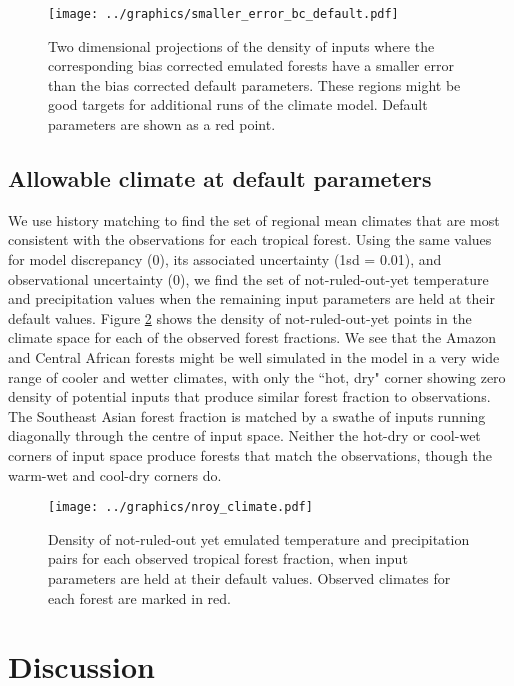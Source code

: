 \documentclass[gmd, manuscript]{copernicus}
\begin{document}
\begin{figure}[t]
\texttt{[image: ../graphics/smaller\_error\_bc\_default.pdf]}
\caption{Two dimensional projections of the density of inputs where the corresponding bias corrected emulated forests have a smaller error than the bias corrected default parameters. These regions might be good targets for additional runs of the climate model. Default parameters are shown as a red point.
}
\label{fig:smaller_error_bc_default}
\end{figure}


\subsection{Allowable climate at default parameters}
We use history matching to find the set of regional mean climates that are most consistent with the observations for each tropical forest. Using the same values for model discrepancy (0), its associated uncertainty (1sd = 0.01), and observational uncertainty (0), we find the set of not-ruled-out-yet temperature and precipitation values when the remaining input parameters are held at their default values. Figure \ref{fig:nroy_climate} shows the density of not-ruled-out-yet points in the climate space for each of the observed forest fractions. We see that the Amazon and Central African forests might be well simulated in the model in a very wide range of cooler and wetter climates, with only the ``hot, dry" corner showing zero density of potential inputs that produce similar forest fraction to observations. The Southeast Asian forest fraction is matched by a swathe of inputs running diagonally through the centre of input space. Neither the hot-dry or cool-wet corners of input space produce forests that match the observations, though the warm-wet and cool-dry corners do.

\begin{figure}[t]
\texttt{[image: ../graphics/nroy\_climate.pdf]}
\caption{Density of not-ruled-out yet emulated temperature and precipitation pairs for each observed tropical forest fraction, when input parameters are held at their default values. Observed climates for each forest are marked in red. 
}
\label{fig:nroy_climate}
\end{figure}


\section{Discussion}
\end{document}
